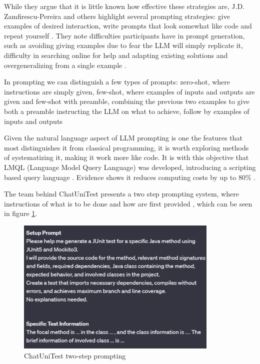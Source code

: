 While they argue that it is little known how effective these strategies are, J.D. Zamfirescu-Pereira and others highlight several prompting strategies: give examples of desired interaction, write prompts that look somewhat like code and repeat yourself \citep{kn:johnny}. They note difficulties participants have in prompt generation, such as avoiding giving examples due to fear the LLM will simply replicate it, difficulty in searching online for help and adapting existing solutions and overgeneralizing from a single example \citep{kn:johnny}.

In prompting we can distinguish a few types of prompts: zero-shot, where instructions are simply given, few-shot, where examples of inputs and outputs are given and few-shot with preamble, combining the previous two examples to give both a preamble instructing the LLM on what to achieve, follow by examples of inputs and outputs \citep{kn:promptprofiannaca}

Given the natural language aspect of LLM prompting is one the features that most distinguishes it from classical programming, it is worth exploring methods of systematizing it, making it work more like code. It is with this objective that LMQL (Language Model Query Language) was developed, introducing a scripting based query language \citep{kn:lmql}. Evidence shows it reduces computing costs by up to 80\% \citep{kn:lmql}.

The team behind ChatUniTest presents a two step prompting system, where instructions of what is to be done and how are first provided \citep{kn:chatunitest}, which can be seen in figure \ref{fig:chunit}.

\begin{figure}
    \centering
    \includegraphics[width=0.86\textwidth]{figures/chatunittestprompt.png}
    \caption{ChatUniTest two-step prompting \citep{kn:chatunitest}}
    \label{fig:chunit}
\end{figure}


